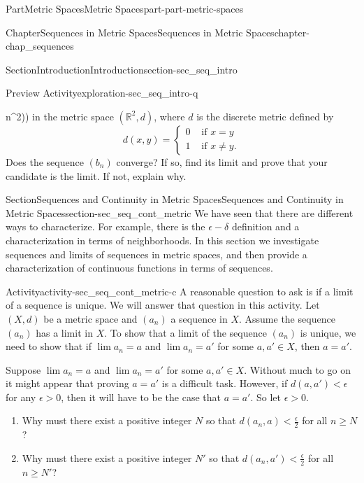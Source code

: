 \documentclass[oneside,10pt,]{book}
\numberwithin{equation}{chapter}
\newcommand{\R}{\mathbb{R}}
\newcommand{\lt}{<}
\newcommand{\gt}{>}
\newcommand{\amp}{&}
\begin{document}
\begin{partptx}{Part}{Metric Spaces}{}{Metric Spaces}{}{}{part-part-metric-spaces}
\begin{chapterptx}{Chapter}{Sequences in Metric Spaces}{}{Sequences in Metric Spaces}{}{}{chapter-chap_sequences}
\begin{sectionptx}{Section}{Introduction}{}{Introduction}{}{}{section-sec_seq_intro}
\begin{exploration}{Preview Activity}{}{exploration-sec_seq_intro-q}
\begin{enumerate}[font=\bfseries,label=(\alph*),ref=\alph*]
n^2)\right)\) in the metric space \((\R^2, d)\), where \(d\) is the discrete metric defined by%
\begin{equation*}
d(x,y) = \begin{cases}0 \amp \text{ if }  x=y \\ 1 \amp \text{ if }  x \neq y. \end{cases}
\end{equation*}
Does the sequence \((b_n)\) converge? If so, find its limit and prove that your candidate is the limit. If not, explain why.%
\end{enumerate}%
\end{exploration}%
\end{sectionptx}
%
%
\typeout{************************************************}
\typeout{************************************************}
%
\begin{sectionptx}{Section}{Sequences and Continuity in Metric Spaces}{}{Sequences and Continuity in Metric Spaces}{}{}{section-sec_seq_cont_metric}
We have seen that there are different ways to characterize. For example, there is the \(\epsilon - \delta\) definition and a characterization in terms of neighborhoods. In this section we investigate sequences and limits of sequences in metric spaces, and then provide a characterization of continuous functions in terms of sequences.%
\begin{activity}{Activity}{}{activity-sec_seq_cont_metric-c}%
A reasonable question to ask is if a limit of a sequence is unique. We will answer that question in this activity. Let \((X,d)\) be a metric space and \((a_n)\) a sequence in \(X\). Assume the sequence \((a_n)\) has a limit in \(X\). To show that a limit of the sequence \((a_n)\) is unique, we need to show that if \(\lim a_n = a\) and \(\lim a_n = a'\) for some \(a,
a' \in X\), then \(a=a'\).%
\par
Suppose \(\lim a_n = a\) and \(\lim a_n = a'\) for some \(a, a' \in X\). Without much to go on it might appear that proving \(a=a'\) is a difficult task. However, if \(d(a,a') \lt \epsilon\) for any \(\epsilon \gt 0\), then it will have to be the case that \(a=a'\). So let \(\epsilon \gt 0\).%
\begin{enumerate}[font=\bfseries,label=(\alph*),ref=\alph*]%
\item{}Why must there exist a positive integer \(N\) so that \(d(a_n, a) \lt \frac{\epsilon}{2}\) for all \(n \geq N\)?%
\item{}Why must there exist a positive integer \(N'\) so that \(d(a_n, a') \lt \frac{\epsilon}{2}\) for all \(n \geq N'\)?%

\end{enumerate}
\end{activity}
\end{sectionptx}
\end{chapterptx}
\end{partptx}
\end{document}
